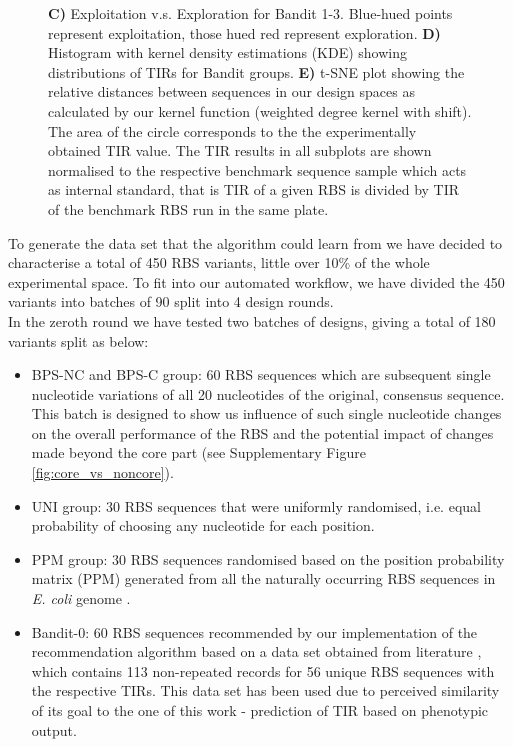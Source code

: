 \documentclass{article}
\newcommand{\mengyan}[1]{\textcolor{magenta}{#1}}
\begin{document}
\begin{figure}[!ht]
{    \textbf{C)} Exploitation v.s. Exploration for Bandit 1-3. Blue-hued points represent exploitation, those hued red represent exploration. 
    \textbf{D)} Histogram with kernel density estimations (KDE) showing distributions of TIRs for Bandit groups.
    \textbf{E)} t-SNE plot showing the relative distances between sequences in our design spaces as calculated by our kernel function (weighted degree kernel with shift). 
    The area of the circle corresponds to the the experimentally obtained TIR value.
    The TIR results in all subplots are shown normalised to the respective benchmark sequence sample which acts as internal standard, that is TIR of a given RBS is divided by TIR of the benchmark RBS run in the same plate. }
    \label{fig: Swarmplot and Quantplot}
\end{figure}

To generate the data set that the algorithm could learn from we have decided to characterise a total of 450 RBS variants, little over 10\% of the whole experimental space. 
To fit into our automated workflow, we have divided the 450 variants into batches of 90 split into 4 design rounds.\\

In the zeroth round we have tested two batches of designs, giving a total of 180 variants split as below: 

\begin{itemize}
    \item BPS-NC and BPS-C group: 60 RBS sequences which are subsequent single nucleotide variations of all 20 nucleotides of the original, consensus sequence. This batch is designed to show us influence of such single nucleotide changes on the overall performance of the RBS and the potential impact of changes made beyond the core part (see Supplementary Figure \ref{fig:core_vs_noncore}).
    \item UNI group: 30 RBS sequences that were  uniformly randomised, i.e. equal probability of choosing any nucleotide for each position. 
    \item PPM group: 30 RBS sequences randomised based on the position probability matrix (PPM) generated from all the naturally occurring RBS sequences in \emph{E. coli} genome \cite{barrick1994quantitative}.
    \item Bandit-0: 60 RBS sequences recommended by our implementation of the recommendation algorithm based on a data set obtained from literature \cite{jervis2018machine}, which contains 113 non-repeated records for 56 unique RBS sequences with the respective TIRs.
    This data set has been used due to perceived similarity of its goal to the one of this work - prediction of TIR based on phenotypic output.
\end{itemize}
\end{document}
